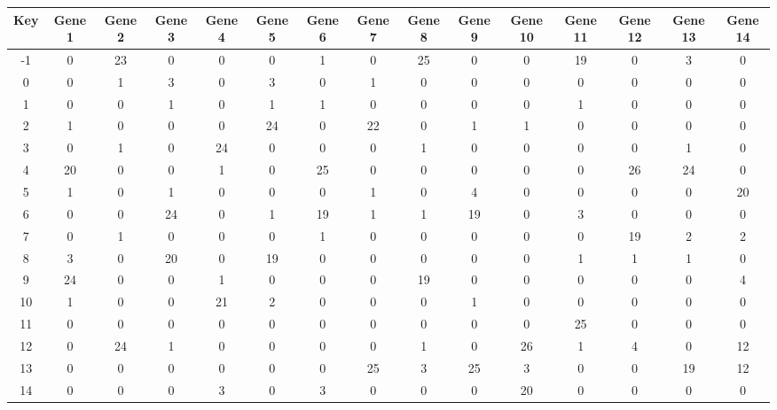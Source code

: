\begin{tabular}{|c|c|c|c|c|c|c|c|c|c|c|c|c|c|c|}
\hline
Key & Gene 1 & Gene 2 & Gene 3 & Gene 4 & Gene 5 & Gene 6 & Gene 7 & Gene 8 & Gene 9 & Gene 10 & Gene 11 & Gene 12 & Gene 13 & Gene 14 \\
\hline
-1 & 0 & 23 & 0 & 0 & 0 & 1 & 0 & 25 & 0 & 0 & 19 & 0 & 3 & 0 \\
0 & 0 & 1 & 3 & 0 & 3 & 0 & 1 & 0 & 0 & 0 & 0 & 0 & 0 & 0 \\
1 & 0 & 0 & 1 & 0 & 1 & 1 & 0 & 0 & 0 & 0 & 1 & 0 & 0 & 0 \\
2 & 1 & 0 & 0 & 0 & 24 & 0 & 22 & 0 & 1 & 1 & 0 & 0 & 0 & 0 \\
3 & 0 & 1 & 0 & 24 & 0 & 0 & 0 & 1 & 0 & 0 & 0 & 0 & 1 & 0 \\
4 & 20 & 0 & 0 & 1 & 0 & 25 & 0 & 0 & 0 & 0 & 0 & 26 & 24 & 0 \\
5 & 1 & 0 & 1 & 0 & 0 & 0 & 1 & 0 & 4 & 0 & 0 & 0 & 0 & 20 \\
6 & 0 & 0 & 24 & 0 & 1 & 19 & 1 & 1 & 19 & 0 & 3 & 0 & 0 & 0 \\
7 & 0 & 1 & 0 & 0 & 0 & 1 & 0 & 0 & 0 & 0 & 0 & 19 & 2 & 2 \\
8 & 3 & 0 & 20 & 0 & 19 & 0 & 0 & 0 & 0 & 0 & 1 & 1 & 1 & 0 \\
9 & 24 & 0 & 0 & 1 & 0 & 0 & 0 & 19 & 0 & 0 & 0 & 0 & 0 & 4 \\
10 & 1 & 0 & 0 & 21 & 2 & 0 & 0 & 0 & 1 & 0 & 0 & 0 & 0 & 0 \\
11 & 0 & 0 & 0 & 0 & 0 & 0 & 0 & 0 & 0 & 0 & 25 & 0 & 0 & 0 \\
12 & 0 & 24 & 1 & 0 & 0 & 0 & 0 & 1 & 0 & 26 & 1 & 4 & 0 & 12 \\
13 & 0 & 0 & 0 & 0 & 0 & 0 & 25 & 3 & 25 & 3 & 0 & 0 & 19 & 12 \\
14 & 0 & 0 & 0 & 3 & 0 & 3 & 0 & 0 & 0 & 20 & 0 & 0 & 0 & 0 \\
\hline
\end{tabular}